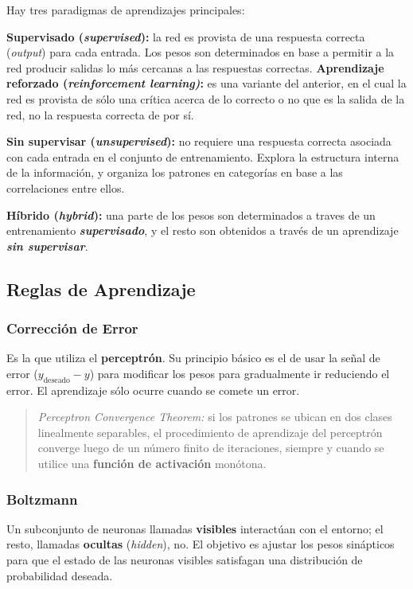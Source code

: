 \documentclass[10pt,a4paper]{article}
\begin{document}
Hay tres paradigmas de aprendizajes principales:
\begin{description}
\item \textbf{Supervisado (\textit{supervised}):} la red es provista de una respuesta correcta (\textit{output}) para cada entrada. Los pesos son determinados en base a permitir a la red producir salidas lo más cercanas a las respuestas correctas.
\subitem \textbf{Aprendizaje reforzado (\textit{reinforcement learning)}:} es una variante del anterior, en el cual la red es provista de sólo una crítica acerca de lo correcto o no que es la salida de la red, no la respuesta correcta de por sí.
\item \textbf{Sin supervisar (\textit{unsupervised}):} no requiere una respuesta correcta asociada con cada entrada en el conjunto de entrenamiento. Explora la estructura interna de la información, y organiza los patrones en categorías en base a las correlaciones entre ellos.
\item \textbf{Híbrido (\textit{hybrid}):} una parte de los pesos son determinados a traves de un entrenamiento \textbf{\textit{supervisado}}, y el resto son obtenidos a través de un aprendizaje \textbf{\textit{sin supervisar}}.
\end{description}

\subsection{Reglas de Aprendizaje}
\subsubsection{Corrección de Error}
Es la que utiliza el \textbf{perceptrón}. Su principio básico es el de usar la señal de error ($y_{\text{deseado}}-y$) para modificar los pesos para gradualmente ir reduciendo el error. El aprendizaje sólo ocurre cuando se comete un error.

\begin{quotation}
\textit{Perceptron Convergence Theorem:} si los patrones se ubican en dos clases linealmente separables, el procedimiento de aprendizaje del perceptrón converge luego de un número finito de iteraciones, siempre y cuando se utilice una \textbf{función de activación} monótona.
\end{quotation}

\subsubsection{Boltzmann}
Un subconjunto de neuronas llamadas \textbf{visibles} interactúan con el entorno; el resto, llamadas \textbf{ocultas} (\textit{hidden}), no. El objetivo es ajustar los pesos sinápticos para que el estado de las neuronas visibles satisfagan una distribución de probabilidad deseada.
\end{document}
